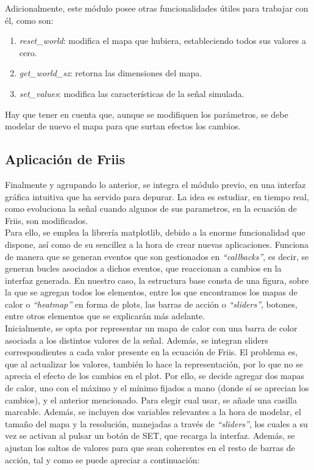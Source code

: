 Adicionalmente, este módulo posee otras funcionalidades útiles para trabajar con él, como son:

\begin{enumerate}
    \item \emph{reset\_world}: modifica el mapa que hubiera, estableciendo todos sus valores a cero.
    \item \emph{get\_world\_sz}: retorna las dimensiones del mapa.
    \item \emph{set\_values}: modifica las características de la señal simulada.
\end{enumerate}

Hay que tener en cuenta que, aunque se modifiquen los parámetros, se debe modelar de nuevo el mapa para que surtan efectos los cambios.\\

\subsection{Aplicación de Friis}
\label{subsec:friis-app}

Finalmente y agrupando lo anterior, se integra el módulo previo, en una interfaz gráfica intuitiva que ha servido para depurar. La idea es estudiar, en tiempo real, como evoluciona la señal cuando algunos de sus parametros, en la ecuación de Friis, son modificados.\\

Para ello, se emplea la librería matplotlib, debido a la enorme funcionalidad que dispone, así como de su sencillez a la hora de crear nuevas aplicaciones. Funciona de manera que se generan eventos que son gestionados en \emph{``callbacks''}, es decir, se generan bucles asociados a dichos eventos, que reaccionan a cambios en la interfaz generada. En nuestro caso, la estructura base consta de una figura, sobre la que se agregan todos los elementos, entre los que encontramos los mapas de calor o \emph{``heatmap''} en forma de plots, las barras de acción o \emph{``sliders''}, botones, entre otros elementos que se explicarán más adelante.\\

Inicialmente, se opta por representar un mapa de calor con una barra de color asociada a los distintos valores de la señal. Además, se integran sliders correspondientes a cada valor presente en la ecuación de Friis. El problema es, que al actualizar los valores, también lo hace la representación, por lo que no se aprecia el efecto de los cambios en el plot. Por ello, se decide agregar dos mapas de calor, uno con el máximo y el mínimo fijados a mano (donde sí se aprecian los cambios), y el anterior mencionado. Para elegir cual usar, se añade una casilla marcable. Además, se incluyen dos variables relevantes a la hora de modelar, el tamaño del mapa y la resolución, manejadas a través de \emph{``sliders''}, los cuales a su vez se activan al pulsar un botón de SET, que recarga la interfaz. Además, se ajustan los saltos de valores para que sean coherentes en el resto de barras de acción, tal y como se puede apreciar a continuación:\\


